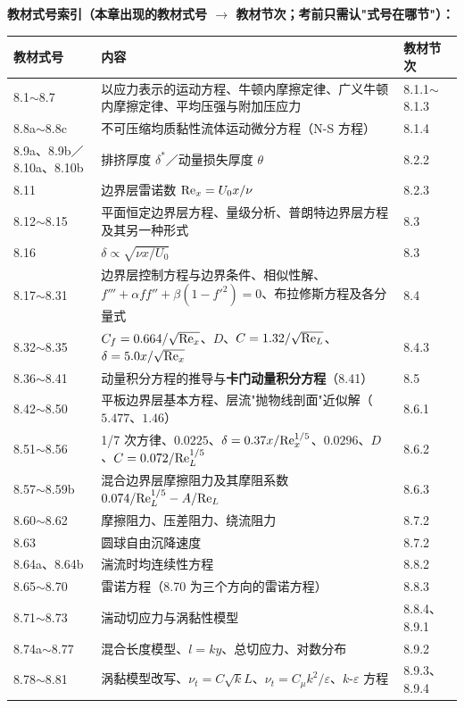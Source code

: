 \textbf{教材式号索引（本章出现的教材式号 $\to$ 教材节次；考前只需认"式号在哪节"）：}
\begin{center}
\begin{tabularx}{\textwidth}{@{}lXX@{}}
\toprule
教材式号 & 内容 & 教材节次 \\
\midrule
8.1$\sim$8.7 & 以应力表示的运动方程、牛顿内摩擦定律、广义牛顿内摩擦定律、平均压强与附加压应力 & 8.1.1$\sim$8.1.3 \\
8.8a$\sim$8.8c & 不可压缩均质黏性流体运动微分方程（N-S 方程） & 8.1.4 \\
8.9a、8.9b／8.10a、8.10b & 排挤厚度 $\delta^*$／动量损失厚度 $\theta$ & 8.2.2 \\
8.11 & 边界层雷诺数 $\mathrm{Re}_x=U_0x/\nu$ & 8.2.3 \\
8.12$\sim$8.15 & 平面恒定边界层方程、量级分析、普朗特边界层方程及其另一种形式 & 8.3 \\
8.16 & $\delta\propto\sqrt{\nu x/U_0}$ & 8.3 \\
8.17$\sim$8.31 & 边界层控制方程与边界条件、相似性解、$f'''+\alpha ff''+\beta(1-f'^2)=0$、布拉修斯方程及各分量式 & 8.4 \\
8.32$\sim$8.35 & $C_f=0.664/\sqrt{\mathrm{Re}_x}$、$D$、$C=1.32/\sqrt{\mathrm{Re}_L}$、$\delta=5.0x/\sqrt{\mathrm{Re}_x}$ & 8.4.3 \\
8.36$\sim$8.41 & 动量积分方程的推导与\textbf{卡门动量积分方程}（8.41） & 8.5 \\
8.42$\sim$8.50 & 平板边界层基本方程、层流"抛物线剖面"近似解（$5.477$、$1.46$） & 8.6.1 \\
8.51$\sim$8.56 & 1/7 次方律、$0.0225$、$\delta=0.37x/\mathrm{Re}_x^{1/5}$、$0.0296$、$D$、$C=0.072/\mathrm{Re}_L^{1/5}$ & 8.6.2 \\
8.57$\sim$8.59b & 混合边界层摩擦阻力及其摩阻系数 $0.074/\mathrm{Re}_L^{1/5}-A/\mathrm{Re}_L$ & 8.6.3 \\
8.60$\sim$8.62 & 摩擦阻力、压差阻力、绕流阻力 & 8.7.2 \\
8.63 & 圆球自由沉降速度 & 8.7.2 \\
8.64a、8.64b & 湍流时均连续性方程 & 8.8.2 \\
8.65$\sim$8.70 & 雷诺方程（8.70 为三个方向的雷诺方程） & 8.8.3 \\
8.71$\sim$8.73 & 湍动切应力与涡黏性模型 & 8.8.4、8.9.1 \\
8.74a$\sim$8.77 & 混合长度模型、$l=ky$、总切应力、对数分布 & 8.9.2 \\
8.78$\sim$8.81 & 涡黏模型改写、$\nu_t=C\sqrt{k}L$、$\nu_t=C_\mu k^2/\varepsilon$、$k$-$\varepsilon$ 方程 & 8.9.3、8.9.4 \\
\bottomrule
\end{tabularx}
\end{center}

